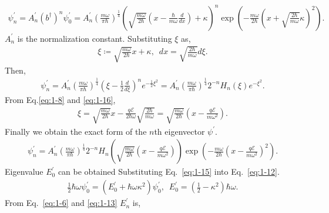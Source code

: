 \documentclass[floatfix,nofootinbib,superscriptaddress,fleqn]{revtex4-2}
\begin{document}
\begin{itemize}
    \begin{align}
      \psi_n^\prime = A_n^\prime(b^\dagger)^n
      \psi_0^\prime
      = A_n^\prime\left(\frac{m\omega}{\pi\hbar}\right)
      ^{\frac{1}{4}}
      \left(
        \sqrt{\frac{m\omega}{2\hbar}}
        \left(x-\frac{\hbar}{m\omega}\frac{d}{dx}\right)
      +\kappa\right)^n
      \exp{\left(-\frac{m\omega}{2\hbar}
      {\left(x +\sqrt{\frac{2\hbar}{m\omega}}\kappa\right)}
        ^2\right)}.
    \end{align}
    $A_n^\prime$ is the normalization constant. Substituting $\xi$ as,
    \begin{align}\label{eq:1-16}
      \xi \coloneqq \sqrt{\frac{m\omega}{2\hbar}}x+\kappa,\,\,\,
      dx = \sqrt{\frac{2\hbar}{m\omega}}d\xi.
    \end{align}
    Then,
    \begin{align}
      \psi_n^\prime=A_n^\prime\left(\frac{m\omega}{\pi\hbar}\right)
      ^{\frac{1}{4}}
      \left(
      \xi-\frac{1}{2}\frac{d}{d\xi}
      \right)^ne^{-\frac{1}{2}\xi^2}
      =A_n^\prime\left(\frac{m\omega}{\pi\hbar}\right)
      ^{\frac{1}{4}}2^{-n}
      H_n(\xi)e^{-\xi^2}.
    \end{align}
    From Eq.\eqref{eq:1-8} and \eqref{eq:1-16},
    \begin{align}
      \xi = \sqrt{\frac{m\omega}{2\hbar}}x
      -\frac{q\mathcal{E}}{2\hbar\omega}
       \sqrt{\frac{2\hbar}{m\omega}}
      =\sqrt{\frac{m\omega}{2\hbar}}\left(x
      -\frac{q\mathcal{E}}{m\omega^2}\right).
    \end{align}
    Finally we obtain the exact form of the $n$th eigenvector $\psi^\prime$.
    \begin{align}\label{eq:1-15}
      \psi_n^\prime=A_n^\prime\left(\frac{m\omega}{\pi\hbar}\right)
      ^{\frac{1}{4}}2^{-n}
      H_n\left(\sqrt{\frac{m\omega}{2\hbar}}\left(x
      -\frac{q\mathcal{E}}{m\omega^2}\right)\right)
      \exp{\left(-\frac{m\omega}{2\hbar}\left(x
      -\frac{q\mathcal{E}}{m\omega^2}\right)^2\right)}.
    \end{align}
    Eigenvalue $E_0^\prime$ can be obtained Substituting Eq.~\eqref{eq:1-15}
    into Eq.~\eqref{eq:1-12}.
    \begin{align}
      \frac{1}{2}\hbar\omega\psi_0^\prime 
      = (E_0^\prime+\hbar\omega\kappa^2)\psi^\prime_0,\,\,\,
      E_0^\prime = \left(\frac{1}{2}-\kappa^2\right)\hbar\omega.
    \end{align}
    From Eq.~\eqref{eq:1-6} and \eqref{eq:1-13} $E_n^\prime$ is,
    \begin{align}

\end{align}
\end{itemize}
\end{document}

